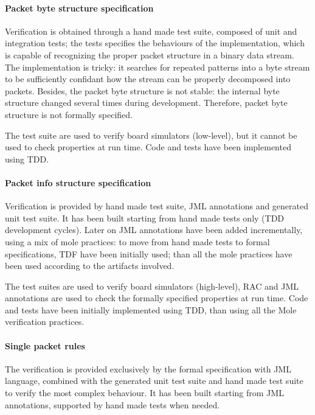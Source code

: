 \documentclass[english]{lni}
\begin{document}
\paragraph*{Packet byte structure specification}

Verification is obtained through a hand made test suite, composed of unit and integration tests; the tests specifies the behaviours of the implementation, which is capable of recognizing the proper packet structure in a binary data stream. 
The implementation is tricky: it searches for repeated patterns into a byte stream to be sufficiently confidant how the stream can be properly decomposed into packets.
Besides, the packet byte structure is not stable: the internal byte structure changed several times during development.
Therefore, packet byte structure is not formally specified.

The test suite are used to verify board simulators (low-level), but it cannot be used to check properties at run time.
Code and tests have been implemented using TDD.

\paragraph*{Packet info structure specification}

Verification is provided by hand made test suite, JML annotations and generated unit test suite. 
It has been built starting from hand made tests only (TDD development cycles).
Later on JML annotations have been added incrementally, using a mix of mole practices: to move from hand made tests to formal specifications, TDF have been initially used; than all the mole practices have been used according to the artifacts involved.

The test suites are used to verify board simulators (high-level), RAC and JML annotations are used to check the formally specified properties at run time.
Code and tests have been initially implemented using TDD, than using all the Mole verification practices.

\paragraph*{Single packet rules}

The verification is provided exclusively by the formal specification with JML language, combined with the generated unit test suite and hand made test suite to verify the most complex behaviour.
It has been built starting from JML annotations, supported by hand made tests when needed.
\end{document}
